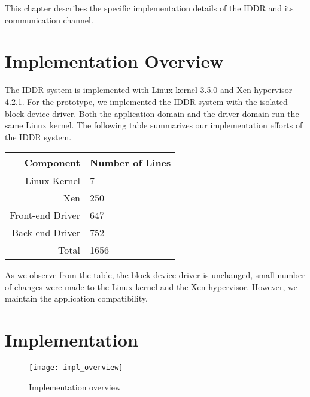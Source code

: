 This chapter describes the specific implementation details of the IDDR and its communication channel.

\section{Implementation Overview} 
The IDDR system is implemented with Linux kernel 3.5.0 and Xen hypervisor 4.2.1. For the prototype, we implemented the IDDR system with the isolated block device driver. Both the application domain and the driver domain run the same Linux kernel. The following table summarizes our implementation efforts of the IDDR system. 

\begin{center}
\begin{tabular}{|r|l|} 
  \hline
  Component & Number of Lines \\
  \hline
  Linux Kernel & 7 \\
  Xen & 250 \\
  Front-end Driver & 647 \\
  Back-end Driver & 752 \\
  \hline 
  Total & 1656\\
  \hline
\end{tabular}
\end{center}

As we observe from the table, the block device driver is unchanged, small number of changes were made to the Linux kernel and the Xen hypervisor. However, we maintain the application compatibility.

\section{Implementation}

\begin{figure}[!ht]
\centering
\texttt{[image: impl\_overview]}
\caption{Implementation overview}
\label{fig:Implementation overview}
\end{figure}

